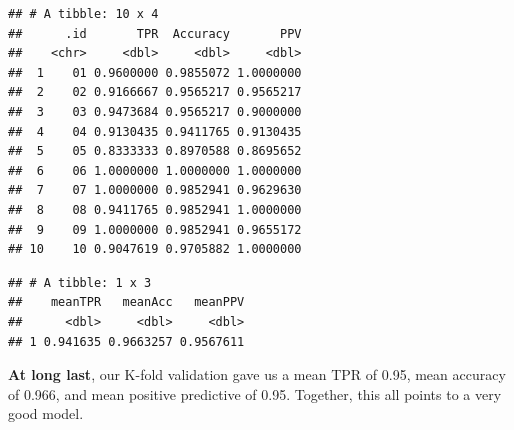 \documentclass[]{article}
\newenvironment{Shaded}{\begin{snugshade}}{\end{snugshade}}
\newcommand{\KeywordTok}[1]{\textcolor[rgb]{0.13,0.29,0.53}{\textbf{#1}}}
\newcommand{\DataTypeTok}[1]{\textcolor[rgb]{0.13,0.29,0.53}{#1}}
\newcommand{\StringTok}[1]{\textcolor[rgb]{0.31,0.60,0.02}{#1}}
\newcommand{\OperatorTok}[1]{\textcolor[rgb]{0.81,0.36,0.00}{\textbf{#1}}}
\newcommand{\NormalTok}[1]{#1}
\begin{document}
\begin{verbatim}
## # A tibble: 10 x 4
##      .id       TPR  Accuracy       PPV
##    <chr>     <dbl>     <dbl>     <dbl>
##  1    01 0.9600000 0.9855072 1.0000000
##  2    02 0.9166667 0.9565217 0.9565217
##  3    03 0.9473684 0.9565217 0.9000000
##  4    04 0.9130435 0.9411765 0.9130435
##  5    05 0.8333333 0.8970588 0.8695652
##  6    06 1.0000000 1.0000000 1.0000000
##  7    07 1.0000000 0.9852941 0.9629630
##  8    08 0.9411765 0.9852941 1.0000000
##  9    09 1.0000000 0.9852941 0.9655172
## 10    10 0.9047619 0.9705882 1.0000000
\end{verbatim}

\begin{Shaded}
\end{Shaded}

\begin{verbatim}
## # A tibble: 1 x 3
##    meanTPR   meanAcc   meanPPV
##      <dbl>     <dbl>     <dbl>
## 1 0.941635 0.9663257 0.9567611
\end{verbatim}

\textbf{At long last}, our K-fold validation gave us a mean TPR of 0.95,
mean accuracy of 0.966, and mean positive predictive of 0.95. Together,
this all points to a very good model.
\end{document}
